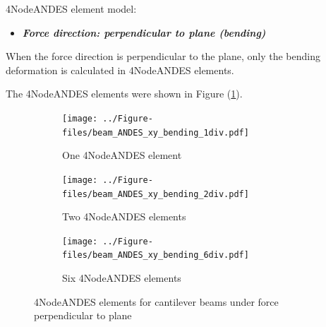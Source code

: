\documentclass[fleqn,11pt]{article}
\begin{document}
4NodeANDES element model:

\vskip 12pt

\begin{itemize}
  \item \textbf{\emph{Force direction: perpendicular to plane (bending)}}
\end{itemize}
When the force direction is perpendicular to the plane, only the bending deformation is calculated in 4NodeANDES elements. 


The 4NodeANDES elements were shown in Figure (\ref{fig 4NodeANDES elements for cantilever beams under force perpendicular to plane}).

\begin{figure}[H]
  \centering
  \begin{subfigure}{0.5\textwidth}
    \centering
    \texttt{[image: ../Figure-files/beam\_ANDES\_xy\_bending\_1div.pdf]}
    \caption{One 4NodeANDES element}
  \end{subfigure}
  \vskip 8pt
  \begin{subfigure}{0.5\textwidth}
    \centering
    \texttt{[image: ../Figure-files/beam\_ANDES\_xy\_bending\_2div.pdf]}
    \caption{Two 4NodeANDES elements}
  \end{subfigure}
  \vskip 8pt
  \begin{subfigure}{0.5\textwidth}
    \centering
    \texttt{[image: ../Figure-files/beam\_ANDES\_xy\_bending\_6div.pdf]}
    \caption{Six 4NodeANDES elements}
  \end{subfigure}
  \captionsetup{justification=centering,margin=3cm}
  \caption{4NodeANDES elements for cantilever beams under force perpendicular to plane}
  \label{fig 4NodeANDES elements for cantilever beams under force perpendicular to plane}
\end{figure}







\end{document}
